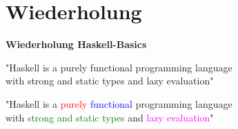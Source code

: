 \documentclass[unknownkeysallowed]{beamer}
\begin{document}

\section{Wiederholung}
\begin{frame}
\begin{center}
\Large\textbf{Wiederholung Haskell-Basics}
\end{center}
\end{frame}


\begin{frame}
\begin{center}

  "Haskell is a purely functional programming language\\with strong and static types
  and lazy evaluation"
  
\end{center}
\end{frame}


\begin{frame}
\begin{center}

  "Haskell is a \textcolor{red}{purely} \textcolor{blue}{functional} programming language \\ with \textcolor{green}{strong and static types} and \textcolor{magenta}{lazy evaluation}"
  
\end{center}
\end{frame}
  
  
\end{document}
